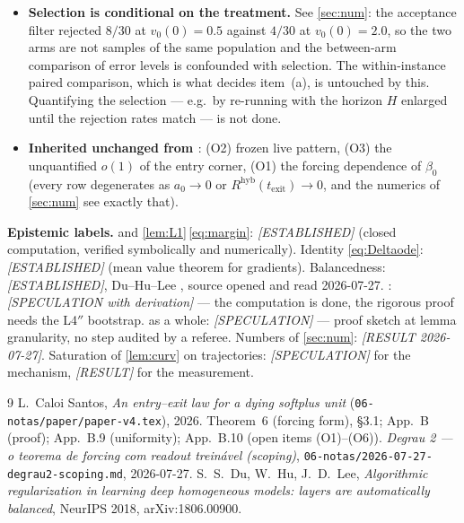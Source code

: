 \documentclass[11pt]{article}
\theoremstyle{remark}
\newcommand{\texit}{t_{\mathrm{exit}}}
\newcommand{\hyb}{\mathrm{hyb}}
\begin{document}
\begin{itemize}
\item[(P9)] \textbf{Selection is conditional on the treatment.} See
\cref{sec:num}: the acceptance filter rejected $8/30$ at $v_0(0)=0.5$ against
$4/30$ at $v_0(0)=2.0$, so the two arms are not samples of the same population
and the between-arm comparison of error levels is confounded with selection.
The within-instance paired comparison, which is what decides item~(a), is
untouched by this. Quantifying the selection --- e.g.\ by re-running with the
horizon $H$ enlarged until the rejection rates match --- is not done.
\item[(P6)] \textbf{Inherited unchanged from \cite{paper}}: (O2) frozen live
pattern, (O3) the unquantified $o(1)$ of the entry corner, (O1) the forcing
dependence of $\beta_0$ (every row degenerates as $a_0\to0$ or
$R^{\hyb}(\texit)\to0$, and the numerics of \cref{sec:num} see exactly that).
\end{itemize}

\bigskip
\noindent\textbf{Epistemic labels.}
 and \cref{lem:L1}\,\eqref{eq:margin}: \emph{[ESTABLISHED]}
(closed computation, verified symbolically and numerically).
Identity \eqref{eq:Deltaode}: \emph{[ESTABLISHED]} (mean value theorem for
gradients).
Balancedness: \emph{[ESTABLISHED]}, Du--Hu--Lee \cite{duhulee}, source opened
and read 2026-07-27.
: \emph{[SPECULATION with derivation]} --- the computation is
done, the rigorous proof needs the L4$''$ bootstrap.
 as a whole: \emph{[SPECULATION]} --- proof sketch at lemma
granularity, no step audited by a referee.
Numbers of \cref{sec:num}: \emph{[RESULT 2026-07-27]}.
Saturation of \cref{lem:curv} on trajectories: \emph{[SPECULATION]} for the
mechanism, \emph{[RESULT]} for the measurement.

\begin{thebibliography}{9}
 L.~Caloi Santos, \emph{An entry--exit law for a dying softplus
unit} (\texttt{06-notas/paper/paper-v4.tex}), 2026. Theorem~6 (forcing form),
\S3.1; App.~B (proof); App.~B.9 (uniformity); App.~B.10 (open items (O1)--(O6)).
 \emph{Degrau 2 --- o teorema de forcing com readout
trein\'avel (scoping)}, \texttt{06-notas/2026-07-27-degrau2-scoping.md}, 2026-07-27.
 S.~S.~Du, W.~Hu, J.~D.~Lee, \emph{Algorithmic regularization
in learning deep homogeneous models: layers are automatically balanced},
NeurIPS 2018, arXiv:1806.00900.
\end{thebibliography}
\end{document}
